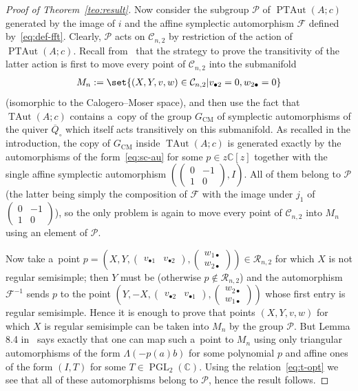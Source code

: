 \documentclass[pdftex]{sigma}
\newcommand{\bb}[1]{\mathbb{#1}}
\newcommand{\ol}[1]{\overline{#1}}
\newcommand{\smm}[1]{\left(\begin{smallmatrix} #1\end{smallmatrix}\right)}
\DeclareMathOperator{\PGL}{PGL}
\DeclareMathOperator{\TAut}{TAut}
\DeclareMathOperator{\PTAut}{PTAut}
\begin{document}
\begin{proof}[Proof of Theorem~\ref{teo:result}]
Now consider the subgroup \(\mathcal{P}\) of \(\PTAut(A;c)\) generated by the image of \(i\) and the
af\/f\/ine symplectic automorphism \(\mathcal{F}\) def\/ined by~\eqref{eq:def-fft}.
Clearly, \(\mathcal{P}\) acts on \(\mathcal{C}_{n,2}\) by restriction of the action of \(\PTAut(A;c)\).
Recall from~\cite{bp08} that the strategy to prove the transitivity of the latter action is f\/irst to move
every point of \(\mathcal{C}_{n,2}\) into the submanifold
\begin{gather*}
M_{n}\mathrel{:=}\set{(X,Y,v,w)\in\mathcal{C}_{n,2}|v_{\bullet2}=0,w_{2\bullet}=0}
\end{gather*}
(isomorphic to the Calogero--Moser space), and then use the fact that \(\TAut(A;c)\) contains a~copy of the
group \(G_{\mathrm{CM}}\) of symplectic automorphisms of the quiver \(\ol{Q}_{\circ}\) which itself acts
transitively on this submanifold.
As recalled in the introduction, the copy of \(G_{\mathrm{CM}}\) inside \(\TAut(A;c)\) is generated exactly
by the automorphisms of the form~\eqref{eq:sc-au} for some \(p\in z\bb{C}[z]\) together with the single
af\/f\/ine symplectic automorphism \((\smm{0 & -1
\\
1 & 0},I)\).
All of them belong to \(\mathcal{P}\) (the latter being simply the composition of \(\mathcal{F}\) with the
image under \(j_{1}\) of \(\smm{0 & -1
\\
1 & 0}\)), so the only problem is again to move every point of \(\mathcal{C}_{n,2}\) into \(M_{n}\) using
an element of \(\mathcal{P}\).

Now take a~point \(p = (X,Y,\smm{v_{\bullet 1} & v_{\bullet 2}}, \smm{w_{1\bullet}
\\
w_{2\bullet}})\in \mathcal{R}_{n,2}\) for which \(X\) is not regular semisimple; then \(Y\) must be
(otherwise \(p\notin \mathcal{R}_{n,2}\)) and the automorphism \(\mathcal{F}^{-1}\) sends \(p\) to the
point \((Y,-X,\smm{v_{\bullet 2} & v_{\bullet 1}}, \smm{w_{2\bullet}
\\
w_{1\bullet}})\) whose f\/irst entry is regular semisimple.
Hence it is enough to prove that points \((X,Y,v,w)\) for which \(X\) is regular semisimple can be taken
into \(M_{n}\) by the group \(\mathcal{P}\).
But Lemma 8.4 in~\cite{bp08} says exactly that one can map such a~point to \(M_{n}\) using only triangular
automorphisms of the form \(\Lambda(-p(a)b)\) for some polynomial \(p\) and af\/f\/ine ones of the form
\((I,T)\) for some \(T\in \PGL_{2}(\bb{C})\).
Using the relation~\eqref{eq:t-opt} we see that all of these automorphisms belong to \(\mathcal{P}\), hence
the result follows.
\end{proof}
\end{document}
